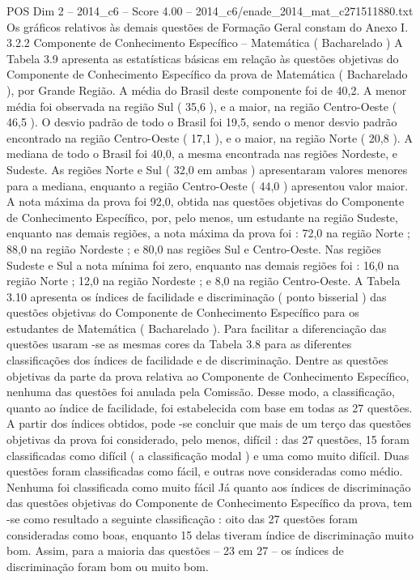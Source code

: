 \begin{textsample}{POS Dim 2 – 2014\_c6 – Score 4.00 – 2014\_c6/enade\_2014\_mat\_c271511880.txt}
Os gráficos relativos às demais questões de Formação Geral constam do Anexo I. 3.2.2 Componente de Conhecimento Específico – Matemática ( Bacharelado ) A Tabela 3.9 apresenta as estatísticas básicas em relação às questões objetivas do Componente de Conhecimento Específico da prova de Matemática ( Bacharelado ), por Grande Região.
A média do Brasil deste componente foi de 40,2.
A menor média foi observada na região Sul ( 35,6 ), e a maior, na região Centro-Oeste ( 46,5 ).
O desvio padrão de todo o Brasil foi 19,5, sendo o menor desvio padrão encontrado na região Centro-Oeste ( 17,1 ), e o maior, na região Norte ( 20,8 ).
A mediana de todo o Brasil foi 40,0, a mesma encontrada nas regiões Nordeste, e Sudeste.
As regiões Norte e Sul ( 32,0 em ambas ) apresentaram valores menores para a mediana, enquanto a região Centro-Oeste ( 44,0 ) apresentou valor maior.
A nota máxima da prova foi 92,0, obtida nas questões objetivas do Componente de Conhecimento Específico, por, pelo menos, um estudante na região Sudeste, enquanto nas demais regiões, a nota máxima da prova foi : 72,0 na região Norte ; 88,0 na região Nordeste ; e 80,0 nas regiões Sul e Centro-Oeste.
Nas regiões Sudeste e Sul a nota mínima foi zero, enquanto nas demais regiões foi : 16,0 na região Norte ; 12,0 na região Nordeste ; e 8,0 na região Centro-Oeste.
A Tabela 3.10 apresenta os índices de facilidade e discriminação ( ponto bisserial ) das questões objetivas do Componente de Conhecimento Específico para os estudantes de Matemática ( Bacharelado ).
Para facilitar a diferenciação das questões usaram -se as mesmas cores da Tabela 3.8 para as diferentes classificações dos índices de facilidade e de discriminação.
Dentre as questões objetivas da parte da prova relativa ao Componente de Conhecimento Específico, nenhuma das questões foi anulada pela Comissão.
Desse modo, a classificação, quanto ao índice de facilidade, foi estabelecida com base em todas as 27 questões.
A partir dos índices obtidos, pode -se concluir que mais de um terço das questões objetivas da prova foi considerado, pelo menos, difícil : das 27 questões, 15 foram classificadas como difícil ( a classificação modal ) e uma como muito difícil.
Duas questões foram classificadas como fácil, e outras nove consideradas como médio.
Nenhuma foi classificada como muito fácil Já quanto aos índices de discriminação das questões objetivas do Componente de Conhecimento Específico da prova, tem -se como resultado a seguinte classificação : oito das 27 questões foram consideradas como boas, enquanto 15 delas tiveram índice de discriminação muito bom.
Assim, para a maioria das questões – 23 em 27 – os índices de discriminação foram bom ou muito bom.

\end{textsample}
